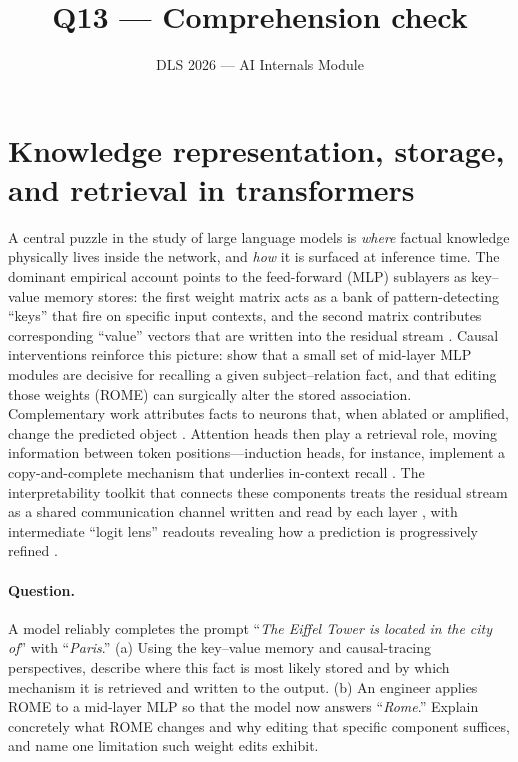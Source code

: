 \documentclass[11pt]{article}
\title{Q13 --- Comprehension check}
\author{DLS 2026 --- AI Internals Module}
\date{}
\begin{document}
\maketitle

\section*{Knowledge representation, storage, and retrieval in transformers}

A central puzzle in the study of large language models is \emph{where} factual
knowledge physically lives inside the network, and \emph{how} it is surfaced at
inference time. The dominant empirical account points to the feed-forward
(MLP) sublayers as key--value memory stores: the first weight matrix acts as a
bank of pattern-detecting ``keys'' that fire on specific input contexts, and
the second matrix contributes corresponding ``value'' vectors that are written
into the residual stream \citep{geva2021kvmemories}. Causal interventions
reinforce this picture: \citet{meng2022rome} show that a small set of
mid-layer MLP modules are decisive for recalling a given subject--relation fact,
and that editing those weights (ROME) can surgically alter the stored
association. Complementary work attributes facts to neurons that, when ablated
or amplified, change the predicted object \citep{dai2022knowledgeneurons}.
Attention heads then play a retrieval role, moving information between token
positions---induction heads, for instance, implement a copy-and-complete
mechanism that underlies in-context recall \citep{olsson2022induction}. The
interpretability toolkit that connects these components treats the residual
stream as a shared communication channel written and read by each layer
\citep{elhage2021mathematical}, with intermediate ``logit lens'' readouts
revealing how a prediction is progressively refined
\citep{geva2022promoting}.

\paragraph{Question.}
A model reliably completes the prompt ``\emph{The Eiffel Tower is located in
the city of}'' with ``\emph{Paris}.'' (a) Using the key--value memory and
causal-tracing perspectives, describe where this fact is most likely stored
and by which mechanism it is retrieved and written to the output. (b) An
engineer applies ROME to a mid-layer MLP so that the model now answers
``\emph{Rome}.'' Explain concretely what ROME changes and why editing that
specific component suffices, and name one limitation such weight edits exhibit.
\end{document}
